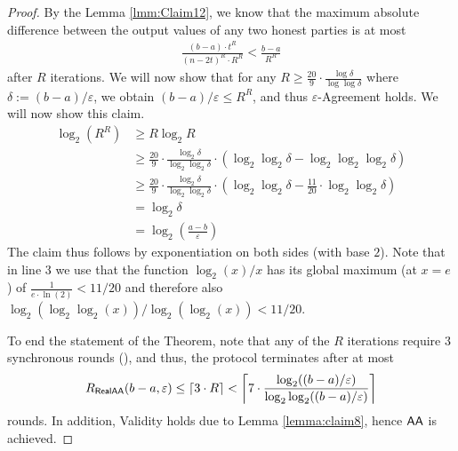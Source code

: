 \RealValuesAA*
\begin{proof}
    By the Lemma \ref{lmm:Claim12}, we know that the maximum absolute difference between the output values of any two honest parties is at most
    \begin{align*}
        \frac{(b-a) \cdot t^R}{(n-2t)^R \cdot R^R} < \frac{b-a}{R^R}
    \end{align*}
    after $R$ iterations. We will now show that for any $R \geq  \frac{20}{9} \cdot \frac{\log \delta}{\log \log \delta}$ where $\delta := (b-a)/\varepsilon$, we obtain $(b-a) / \varepsilon \leq R^R$, and thus $\varepsilon$-Agreement holds. We will now show this claim.
    \begin{align*}
        \log_2(R^R) &\geq R \log_2 R \\
        &\geq \frac{20}{9} \cdot \frac{\log_2 \delta}{\log_2 \log_2 \delta} \cdot (\log_2 \log_2 \delta - \log_2 \log_2 \log_2 \delta) \\
        &\geq \frac{20}{9} \cdot\frac{\log_2 \delta}{\log_2 \log_2 \delta} \cdot (\log_2 \log_2 \delta - \frac{11}{20} \cdot \log_2 \log_2 \delta) \\
        &=\log_2 \delta \\
        &= \log_2\left( \frac{a-b}{\varepsilon} \right)
    \end{align*}
    The claim thus follows by exponentiation on both sides (with base $2$).
    Note that in line 3 we use that the function $\log_2(x)/x$ has its global maximum (at $x = e$) of $\frac{1}{e \cdot \ln(2)} < 11/20$ and therefore also $\log_2(\log_2\log_2(x))/\log_2(\log_2(x)) < 11/20$. 
    
    To end the statement of the Theorem, note that any of the $R$ iterations require $3$ synchronous rounds (\cite{BDH10}), and thus, the protocol terminates after at most
    \begin{align*}
         R_{\textsf{RealAA}}(b - a, \varepsilon) \leq \lceil 3 \cdot R \rceil < \left\lceil 7 \cdot \frac{\log_2 ((b - a)/\varepsilon)}{\log_2 \log_2 ((b - a)/\varepsilon)} \right\rceil
    \end{align*}
    rounds. In addition, Validity holds due to Lemma \ref{lemma:claim8}, hence $\textsf{AA}$ is achieved.
\end{proof}



